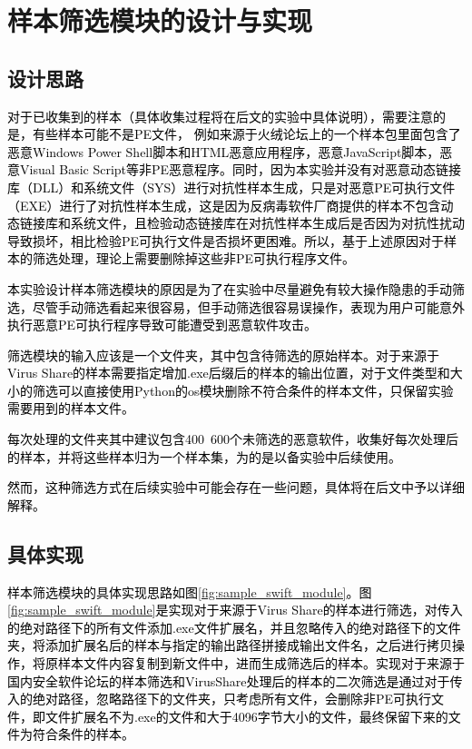 \section{样本筛选模块的设计与实现}

\subsection{设计思路}

\textcolor{black}{对于已收集到的样本（具体收集过程将在后文的实验中具体说明），需要注意的是，有些样本可能不是PE文件， 例如来源于火绒论坛上的一个样本包里面包含了恶意Windows Power Shell脚本和HTML恶意应用程序，恶意JavaScript脚本，恶意Visual Basic Script等非PE恶意程序。同时，因为本实验并没有对恶意动态链接库（DLL）和系统文件（SYS）进行对抗性样本生成，只是对恶意PE可执行文件（EXE）进行了对抗性样本生成，这是因为反病毒软件厂商提供的样本不包含动态链接库和系统文件，且检验动态链接库在对抗性样本生成后是否因为对抗性扰动导致损坏，相比检验PE可执行文件是否损坏更困难。所以，基于上述原因对于样本的筛选处理，理论上需要删除掉这些非PE可执行程序文件。}

\textcolor{black}{本实验设计样本筛选模块的原因是为了在实验中尽量避免有较大操作隐患的手动筛选，尽管手动筛选看起来很容易，但手动筛选很容易误操作，表现为用户可能意外执行恶意PE可执行程序导致可能遭受到恶意软件攻击。}

\textcolor{black}{筛选模块的输入应该是一个文件夹，其中包含待筛选的原始样本。对于来源于Virus Share的样本需要指定增加.exe后缀后的样本的输出位置，对于文件类型和大小的筛选可以直接使用Python的os模块删除不符合条件的样本文件，只保留实验需要用到的样本文件。 }

\textcolor{black}{每次处理的文件夹其中建议包含400~600个未筛选的恶意软件，收集好每次处理后的样本，并将这些样本归为一个样本集，为的是以备实验中后续使用。}

\textcolor{black}{然而，这种筛选方式在后续实验中可能会存在一些问题，具体将在后文中予以详细解释。}

\subsection{具体实现}

\textcolor{black}{样本筛选模块的具体实现思路如图\ref{fig:sample_swift_module}。图\ref{fig:sample_swift_module}是实现对于来源于Virus Share的样本进行筛选，对传入的绝对路径下的所有文件添加.exe文件扩展名，并且忽略传入的绝对路径下的文件夹，将添加扩展名后的样本与指定的输出路径拼接成输出文件名，之后进行拷贝操作，将原样本文件内容复制到新文件中，进而生成筛选后的样本。实现对于来源于国内安全软件论坛的样本筛选和VirusShare处理后的样本的二次筛选是通过对于传入的绝对路径，忽略路径下的文件夹，只考虑所有文件，会删除非PE可执行文件，即文件扩展名不为.exe的文件和大于4096字节大小的文件，最终保留下来的文件为符合条件的样本。}

